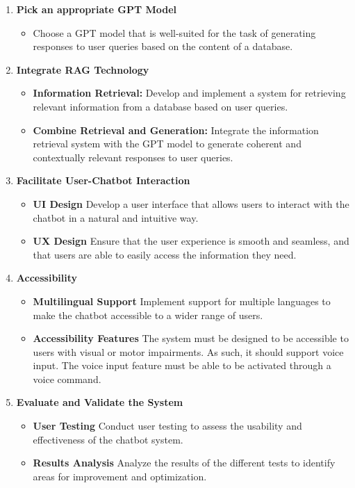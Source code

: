 \documentclass[a4paper,12pt,twoside]{ThesisStyle}
\begin{document}
\begin{enumerate}
  \item \textbf{Pick an appropriate GPT Model}
        \begin{itemize}
          \item Choose a GPT model that is well-suited for the task of generating responses to user queries based on the content of a database.
        \end{itemize}
  \item \textbf{Integrate RAG Technology}
        \begin{itemize}
          \item \textbf{Information Retrieval:} Develop and implement a system for retrieving relevant information from a database based on user queries.
          \item \textbf{Combine Retrieval and Generation:} Integrate the information retrieval system with the GPT model to generate coherent and contextually relevant responses to user queries.
        \end{itemize}
  \item \textbf{Facilitate User-Chatbot Interaction}
        \begin{itemize}
          \item \textbf{UI Design} Develop a user interface that allows users to interact with the chatbot in a natural and intuitive way.
          \item \textbf{UX Design} Ensure that the user experience is smooth and seamless, and that users are able to easily access the information they need.
        \end{itemize}
  \item \textbf{Accessibility}
        \begin{itemize}
          \item \textbf{Multilingual Support} Implement support for multiple languages to make the chatbot accessible to a wider range of users.
          \item \textbf{Accessibility Features} The system must be designed to be accessible to users with visual or motor impairments. As such, it should support voice input. The voice input feature must be able to be activated through a voice command.
        \end{itemize}
  \item \textbf{Evaluate and Validate the System}
        \begin{itemize}
          \item \textbf{User Testing} Conduct user testing to assess the usability and effectiveness of the chatbot system.
          \item \textbf{Results Analysis} Analyze the results of the different tests to identify areas for improvement and optimization.
        \end{itemize}
\end{enumerate}
\end{document}
